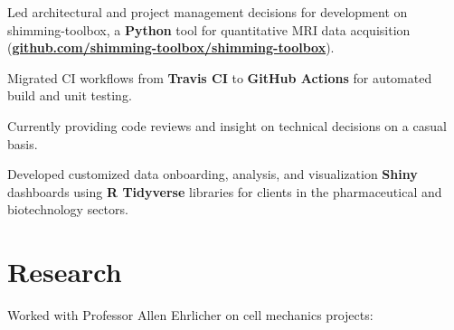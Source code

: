 \documentclass[]{jidicula-resume}
\begin{document}
\vspace{\topsep} %
\begin{tightemize}
\item Led architectural and project management decisions for development on shimming-toolbox, a \textbf{Python} tool for quantitative MRI data acquisition (\href{https://github.com/shimming-toolbox/shimming-toolbox}{\bf github.com/shimming-toolbox/shimming-toolbox}).
\item Migrated CI workflows from \textbf{Travis CI} to \textbf{GitHub Actions} for automated build and unit testing.
\item Currently providing code reviews and insight on technical decisions on a casual basis.
\end{tightemize}
\sectionsep{}

\vspace{\topsep} %
\begin{tightemize}
\item Developed customized data onboarding, analysis, and
  visualization \textbf{Shiny} dashboards using \textbf{R Tidyverse} libraries
  for clients in the pharmaceutical and biotechnology sectors.
\end{tightemize}
\sectionsep{}

\section{Research}
Worked with Professor Allen Ehrlicher on cell mechanics projects:
\end{document}
